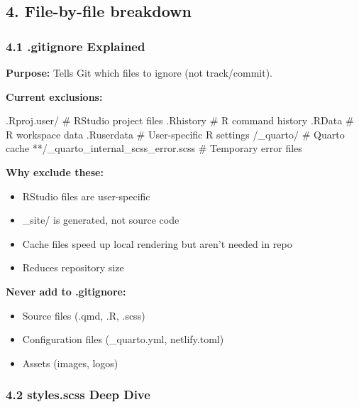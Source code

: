 \documentclass[
  letterpaper,
  DIV=11,
  numbers=noendperiod]{scrartcl}
\newenvironment{Shaded}{\begin{snugshade}}{\end{snugshade}}
\newcommand{\CommentTok}[1]{\textcolor[rgb]{0.37,0.37,0.37}{#1}}
\newcommand{\ExtensionTok}[1]{\textcolor[rgb]{0.00,0.23,0.31}{#1}}
\begin{document}
\subsection{4. File-by-file breakdown}\label{file-by-file-breakdown}

\subsubsection{4.1 .gitignore Explained}\label{gitignore-explained}

\textbf{Purpose:} Tells Git which files to ignore (not track/commit).

\textbf{Current exclusions:}

\begin{Shaded}
\begin{Highlighting}[]
\ExtensionTok{.Rproj.user/}      \CommentTok{\# RStudio project files}
\ExtensionTok{.Rhistory}         \CommentTok{\# R command history}
\ExtensionTok{.RData}            \CommentTok{\# R workspace data}
\ExtensionTok{.Ruserdata}        \CommentTok{\# User{-}specific R settings}
\ExtensionTok{/\_quarto/}         \CommentTok{\# Quarto cache}
\ExtensionTok{**/\_quarto\_internal\_scss\_error.scss}  \CommentTok{\# Temporary error files}
\end{Highlighting}
\end{Shaded}

\textbf{Why exclude these:}

\begin{itemize}
\item
  RStudio files are user-specific
\item
  \_site/ is generated, not source code
\item
  Cache files speed up local rendering but aren't needed in repo
\item
  Reduces repository size
\end{itemize}

\textbf{Never add to .gitignore:}

\begin{itemize}
\item
  Source files (.qmd, .R, .scss)
\item
  Configuration files (\_quarto.yml, netlify.toml)
\item
  Assets (images, logos)
\end{itemize}

\subsubsection{4.2 styles.scss Deep Dive}\label{styles.scss-deep-dive}
\end{document}
